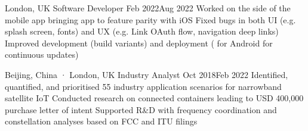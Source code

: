 

               {London, UK}
{Software Developer}                                {Feb 2022}{Aug 2022}
{Worked on the  side of the  mobile app bringing app to feature parity with iOS}
{Fixed bugs in both UI (e.g. splash screen, fonts) and UX (e.g.  Link OAuth flow, navigation deep links)}
{Improved development (build variants) and deployment ( for Android for continuous updates)}


       {Beijing, China · London, UK}
{Industry Analyst}                                  {Oct 2018}{Feb 2022}
{Identified, quantified, and prioritised 55 industry application scenarios for narrowband satellite IoT}
{Conducted research on connected containers leading to USD 400,000 purchase letter of intent}
{Supported R\&D with frequency coordination and constellation analyses based on FCC and ITU filings}





